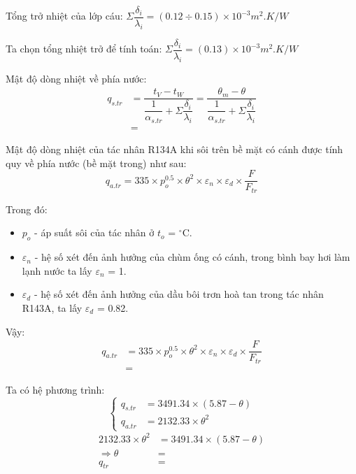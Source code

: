 Tổng trở nhiệt của lớp cáu:
$\Sigma \dfrac{\delta_{i}}{\lambda_{i}} = (0.12 \div 0.15)\times 10^{-3} m^2.K/W$

Ta chọn tổng nhiệt trở để tính toán: $\Sigma \dfrac{\delta_{i}}{\lambda_{i}} = (0.13)\times 10^{-3} m^2.K/W$

Mật độ dòng nhiệt về phía nước:
\begin{equation*}
	\begin{split}
		q_{s.tr} &= \dfrac{t_{V} - t_{W}}{\dfrac{1}{\alpha_{s.tr}} + \Sigma \dfrac{\delta_{i}}{\lambda_{i}}} = \dfrac{\theta_{m} - \theta}{\dfrac{1}{\alpha_{s.tr}} + \Sigma \dfrac{\delta_{i}}{\lambda_{i}}}\\
		&=
	\end{split}
\end{equation*}

Mật độ dòng nhiệt của tác nhân R134A khi sôi trên bề mặt có cánh được tính quy về phía nước (bề mặt trong) như sau:
\begin{equation*}
	q_{a.tr} = 335\times p_{o}^{0.5}\times\theta^2\times\varepsilon_{n}\times\varepsilon_{d}\times\dfrac{F}{F_{tr}}
\end{equation*}

Trong đó:
\begin{itemize}
	\item $p_{o}$ - áp suất sôi của tác nhân ở $t_{o}$ = $^{\circ}$C.
	\item $\varepsilon_{n}$ - hệ số xét đến ảnh hưởng của chùm ống có cánh, trong bình bay hơi làm lạnh nước ta lấy $\varepsilon_{n}$ = 1.
	\item $\varepsilon_{d}$ - hệ số xét đến ảnh hưởng của dầu bôi trơn hoà tan trong tác nhân R143A, ta lấy $\varepsilon_{d}$ = 0.82.
\end{itemize}

Vậy:
\begin{equation*}
	\begin{split}
		q_{a.tr} &= 335\times p_{o}^{0.5}\times\theta^2\times\varepsilon_{n}\times\varepsilon_{d}\times\dfrac{F}{F_{tr}}\\
		&= 
	\end{split}
\end{equation*}

Ta có hệ phương trình:
\begin{equation*}
	\begin{cases}
		q_{s.tr} &= 3491.34\times(5.87 - \theta)\\
		q_{a.tr} &= 2132.33\times\theta^2
	\end{cases}
\end{equation*}
\begin{equation*}
	\begin{split}
	2132.33\times\theta^2 &= 3491.34\times(5.87 - \theta)\\
	\Rightarrow \theta &= \\
				q_{tr} &=
	\end{split}
\end{equation*}

